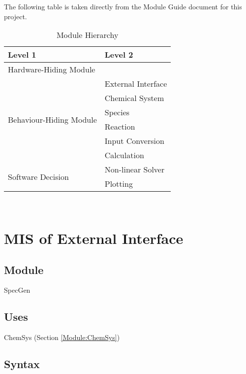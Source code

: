 \documentclass[12pt, titlepage]{article}
\begin{document}
The following table is taken directly from the Module Guide document for this project.
\begin{table}[h!]
\centering
\begin{tabular}{p{} p{}}
\toprule
\textbf{Level 1} & \textbf{Level 2}\\
\midrule

{Hardware-Hiding Module} & ~ \\
\midrule

\multirow{6}{0.3\textwidth}{Behaviour-Hiding Module} & External Interface\\
& Chemical System\\
& Species\\
& Reaction\\
& Input Conversion\\
& Calculation\\
\midrule

\multirow{2}{0.3\textwidth}{Software Decision} & Non-linear Solver\\
& Plotting\\
\bottomrule

\end{tabular}
\caption{Module Hierarchy}
\label{TblMH}
\end{table}

\newpage
~\newpage

\section{MIS of External Interface}

\subsection{Module}

SpecGen 

\subsection{Uses}

ChemSys (Section \ref{Module:ChemSys})


\subsection{Syntax}
\end{document}
